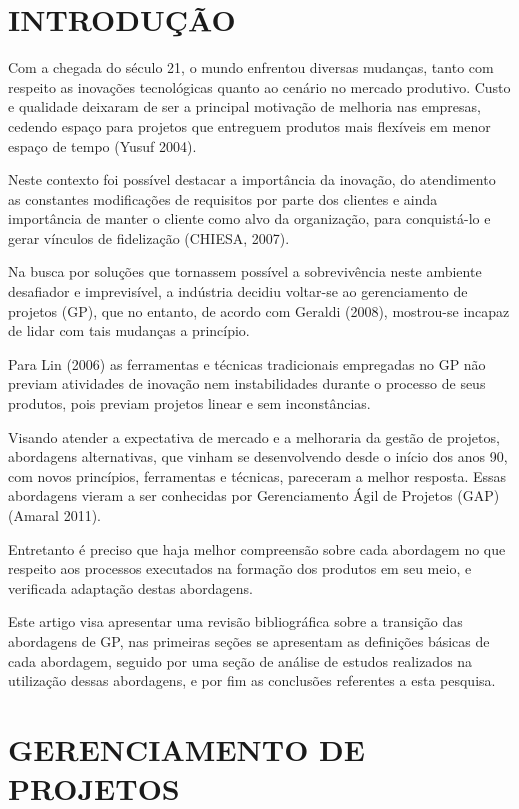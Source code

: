 \onehalfspacing

\section{INTRODUÇÃO}

Com a chegada do século 21, o mundo enfrentou diversas mudanças, tanto com respeito as inovações tecnológicas quanto ao cenário no mercado produtivo. Custo e qualidade deixaram de ser a principal motivação de melhoria nas empresas, cedendo espaço para projetos que entreguem produtos mais flexíveis em menor espaço de tempo (Yusuf 2004).

Neste contexto foi possível destacar a importância da inovação, do atendimento as constantes modificações de requisitos por parte dos clientes e ainda importância de manter o cliente como alvo da organização, para conquistá-lo e gerar vínculos de fidelização (CHIESA, 2007).

Na busca por soluções que tornassem possível a sobrevivência neste ambiente desafiador e imprevisível, a indústria decidiu voltar-se ao gerenciamento de projetos (GP), que no entanto, de acordo com Geraldi (2008), mostrou-se incapaz de lidar com tais mudanças a princípio.

Para Lin (2006) as ferramentas e técnicas tradicionais empregadas no GP não previam atividades de inovação nem instabilidades durante o processo de seus produtos, pois previam projetos linear e sem inconstâncias.

Visando atender a expectativa de mercado e a melhoraria da gestão de projetos, abordagens alternativas, que vinham se desenvolvendo desde o início dos anos 90, com novos princípios, ferramentas e técnicas, pareceram a melhor resposta. Essas abordagens vieram a ser conhecidas por Gerenciamento Ágil de Projetos (GAP) (Amaral 2011).

Entretanto é preciso que haja melhor compreensão sobre cada abordagem no que respeito aos processos executados na formação dos produtos em seu meio, e verificada adaptação destas abordagens.

Este artigo visa apresentar uma revisão bibliográfica sobre a transição das abordagens de GP, nas primeiras seções se apresentam as definições básicas de cada abordagem, seguido por uma seção de análise de estudos realizados na utilização dessas abordagens, e por fim as conclusões referentes a esta pesquisa.

\section{GERENCIAMENTO DE PROJETOS}

